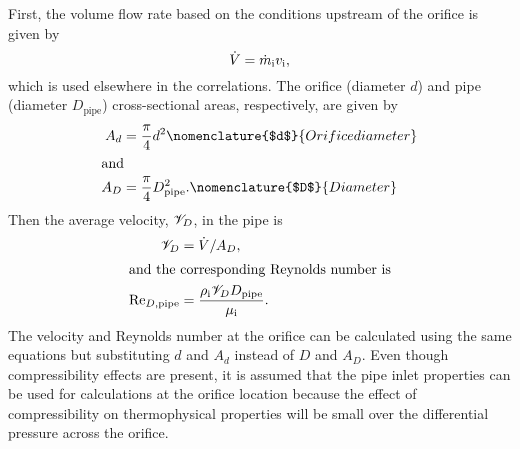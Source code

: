 First, the volume flow rate based on the conditions 
upstream of the orifice is given by
\begin{equation}
  \dot{V} = \dot{m}_{\text{i}}v_{\text{i}},
\end{equation}
which is used elsewhere in the correlations.
The orifice (diameter $d$) and 
pipe (diameter $D_{\text{pipe}}$) cross-sectional areas, 
respectively, are given by
\begin{align}
  A_d &= \frac{\pi}{4} d^2 
  \nomenclature{$d$}{Orifice diameter\nomunit{\foot,\,\inch}} \\
  \shortintertext{and}
  A_D &= \frac{\pi}{4} D_{\text{pipe}}^2.
  \nomenclature{$D$}{Diameter\nomunit{\foot,\,\inch}}
\end{align}
Then  the average velocity, $\mathscr{V}_D$, in the pipe is
\begin{align}
  \mathscr{V}_D &= \dot{V}/A_D, \\
  \intertext{and the corresponding Reynolds number is}
  \mathrm{Re}_{D,\text{pipe}} &= \frac{\rho_{\text{i}} \mathscr{V}_D D_{\text{pipe}}}{\mu_{\text{i}}}.
\end{align}
The velocity and Reynolds number at the orifice can be calculated using 
the same equations but substituting $d$ and $A_d$ instead of $D$ and $A_D$.
Even though compressibility effects are present, it is assumed that the pipe inlet properties
can be used for calculations at the orifice location because the effect of compressibility
on thermophysical properties will be small over the differential pressure across the orifice.

